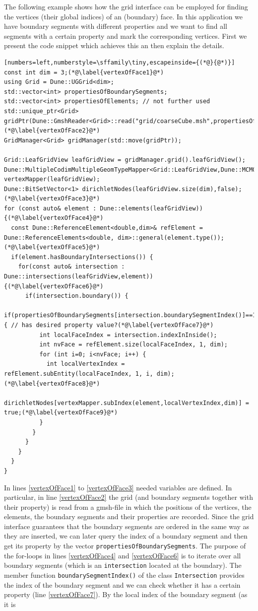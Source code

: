 \documentclass[11pt]{article}
\begin{document}
The following example shows how the grid interface can be employed for finding the vertices (their global indices) of an (boundary) face. In this application we have boundary segments with different properties and we want to find all segments with a certain property and mark the corresponding vertices. First we present the code snippet which achieves this an then explain the details.
\begin{lstlisting}[numbers=left,numberstyle=\sffamily\tiny,escapeinside={(*@}{@*)}]
const int dim = 3;(*@\label{vertexOfFace1}@*)
using Grid = Dune::UGGrid<dim>;
std::vector<int> propertiesOfBoundarySegments;
std::vector<int> propertiesOfElements; // not further used
std::unique_ptr<Grid> gridPtr(Dune::GmshReader<Grid>::read("grid/coarseCube.msh",propertiesOfBoundarySegments,propertiesOfElements));(*@\label{vertexOfFace2}@*)
GridManager<Grid> gridManager(std::move(gridPtr));
    
Grid::LeafGridView leafGridView = gridManager.grid().leafGridView();
Dune::MultipleCodimMultipleGeomTypeMapper<Grid::LeafGridView,Dune::MCMGVertexLayout> vertexMapper(leafGridView);
Dune::BitSetVector<1> dirichletNodes(leafGridView.size(dim),false);(*@\label{vertexOfFace3}@*)
for (const auto& element : Dune::elements(leafGridView)) {(*@\label{vertexOfFace4}@*)
  const Dune::ReferenceElement<double,dim>& refElement = Dune::ReferenceElements<double, dim>::general(element.type());(*@\label{vertexOfFace5}@*)
  if(element.hasBoundaryIntersections()) {
    for(const auto& intersection : Dune::intersections(leafGridView,element)) {(*@\label{vertexOfFace6}@*)
      if(intersection.boundary()) {
        if(propertiesOfBoundarySegments[intersection.boundarySegmentIndex()]==1) { // has desired property value?(*@\label{vertexOfFace7}@*)
          int localFaceIndex = intersection.indexInInside();
          int nvFace = refElement.size(localFaceIndex, 1, dim);
          for (int i=0; i<nvFace; i++) {
            int localVertexIndex = refElement.subEntity(localFaceIndex, 1, i, dim);(*@\label{vertexOfFace8}@*)
            dirichletNodes[vertexMapper.subIndex(element,localVertexIndex,dim)] = true;(*@\label{vertexOfFace9}@*)
          }
        }
      }
    }
  }
} 
\end{lstlisting}
In lines \ref{vertexOfFace1} to \ref{vertexOfFace3} needed variables are defined. In particular, in line \ref{vertexOfFace2} the grid (and boundary segments together with their property) is read from a gmsh-file in which the positions of the vertices, the elements, the boundary segments and their properties are recorded. Since the grid interface guarantees that the boundary segments are ordered in the same way as they are inserted, we can later query the index of a boundary segment and then get its property by the vector \lstinline{propertiesOfBoundarySegments}. The purpose of the for-loops in lines \ref{vertexOfFace4} and \ref{vertexOfFace6} is to iterate over all boundary segments (which is an \lstinline{intersection} located at the boundary). The member function \lstinline{boundarySegmentIndex()} of the class \lstinline{Intersection} provides the index of the boundary segment and we can check whether it has a certain property (line \ref{vertexOfFace7}). By the local index of the boundary segment (as it is 
\end{document}
